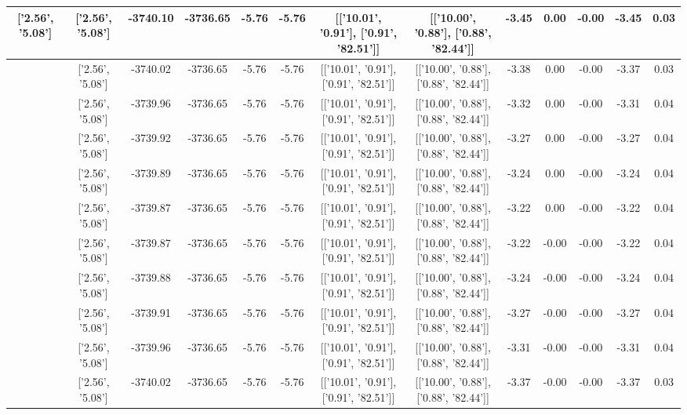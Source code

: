 \begin{table}[htbp]
\begin{adjustbox}{angle=90}
\begin{tabular}{|c|c|c|c|c|c|c|c|c|c|c|c|c|}
 ['2.56', '5.08'] & ['2.56', '5.08'] & -3740.10 & -3736.65 & -5.76 & -5.76 & [['10.01', '0.91'], ['0.91', '82.51']] & [['10.00', '0.88'], ['0.88', '82.44']] & -3.45 & 0.00 & -0.00 & -3.45 & 0.03\\ \hline
 ['2.56', '5.08'] & ['2.56', '5.08'] & -3740.02 & -3736.65 & -5.76 & -5.76 & [['10.01', '0.91'], ['0.91', '82.51']] & [['10.00', '0.88'], ['0.88', '82.44']] & -3.38 & 0.00 & -0.00 & -3.37 & 0.03\\ \hline
 ['2.56', '5.08'] & ['2.56', '5.08'] & -3739.96 & -3736.65 & -5.76 & -5.76 & [['10.01', '0.91'], ['0.91', '82.51']] & [['10.00', '0.88'], ['0.88', '82.44']] & -3.32 & 0.00 & -0.00 & -3.31 & 0.04\\ \hline
 ['2.56', '5.08'] & ['2.56', '5.08'] & -3739.92 & -3736.65 & -5.76 & -5.76 & [['10.01', '0.91'], ['0.91', '82.51']] & [['10.00', '0.88'], ['0.88', '82.44']] & -3.27 & 0.00 & -0.00 & -3.27 & 0.04\\ \hline
 ['2.56', '5.08'] & ['2.56', '5.08'] & -3739.89 & -3736.65 & -5.76 & -5.76 & [['10.01', '0.91'], ['0.91', '82.51']] & [['10.00', '0.88'], ['0.88', '82.44']] & -3.24 & 0.00 & -0.00 & -3.24 & 0.04\\ \hline
 ['2.56', '5.08'] & ['2.56', '5.08'] & -3739.87 & -3736.65 & -5.76 & -5.76 & [['10.01', '0.91'], ['0.91', '82.51']] & [['10.00', '0.88'], ['0.88', '82.44']] & -3.22 & 0.00 & -0.00 & -3.22 & 0.04\\ \hline
 ['2.56', '5.09'] & ['2.56', '5.08'] & -3739.87 & -3736.65 & -5.76 & -5.76 & [['10.01', '0.91'], ['0.91', '82.51']] & [['10.00', '0.88'], ['0.88', '82.44']] & -3.22 & -0.00 & -0.00 & -3.22 & 0.04\\ \hline
 ['2.56', '5.09'] & ['2.56', '5.08'] & -3739.88 & -3736.65 & -5.76 & -5.76 & [['10.01', '0.91'], ['0.91', '82.51']] & [['10.00', '0.88'], ['0.88', '82.44']] & -3.24 & -0.00 & -0.00 & -3.24 & 0.04\\ \hline
 ['2.57', '5.09'] & ['2.56', '5.08'] & -3739.91 & -3736.65 & -5.76 & -5.76 & [['10.01', '0.91'], ['0.91', '82.51']] & [['10.00', '0.88'], ['0.88', '82.44']] & -3.27 & -0.00 & -0.00 & -3.27 & 0.04\\ \hline
 ['2.57', '5.09'] & ['2.56', '5.08'] & -3739.96 & -3736.65 & -5.76 & -5.76 & [['10.01', '0.91'], ['0.91', '82.51']] & [['10.00', '0.88'], ['0.88', '82.44']] & -3.31 & -0.00 & -0.00 & -3.31 & 0.04\\ \hline
 ['2.57', '5.09'] & ['2.56', '5.08'] & -3740.02 & -3736.65 & -5.76 & -5.76 & [['10.01', '0.91'], ['0.91', '82.51']] & [['10.00', '0.88'], ['0.88', '82.44']] & -3.37 & -0.00 & -0.00 & -3.37 & 0.03\\ \hline

\end{tabular}
\end{adjustbox}
\end{table}
